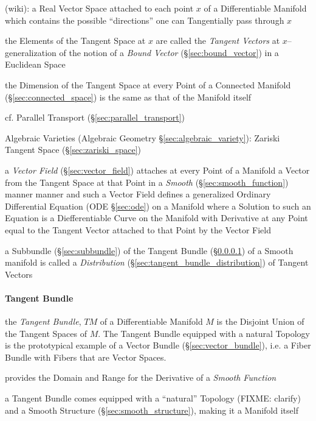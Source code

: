 (wiki): a Real Vector Space attached to each point $x$ of a Differentiable
Manifold which contains the possible ``directions'' one can Tangentially pass
through $x$

the Elements of the Tangent Space at $x$ are called the \emph{Tangent Vectors}
at $x$-- generalization of the notion of a \emph{Bound Vector}
(\S\ref{sec:bound_vector}) in a Euclidean Space

the Dimension of the Tangent Space at every Point of a Connected Manifold
(\S\ref{sec:connected_space}) is the same as that of the Manifold itself

\fist cf. Parallel Transport (\S\ref{sec:parallel_transport})

\fist Algebraic Varieties (Algebraic Geometry \S\ref{sec:algebraic_variety}):
Zariski Tangent Space (\S\ref{sec:zariski_space})

a \emph{Vector Field} (\S\ref{sec:vector_field}) attaches at every Point of a
Manifold a Vector from the Tangent Space at that Point in a \emph{Smooth}
(\S\ref{sec:smooth_function}) manner manner and such a Vector Field defines a
generalized Ordinary Differential Equation (ODE \S\ref{sec:ode}) on a Manifold
where a Solution to such an Equation is a Diefferentiable Curve on the Manifold
with Derivative at any Point equal to the Tangent Vector attached to that Point
by the Vector Field

a Subbundle (\S\ref{sec:subbundle}) of the Tangent Bundle
(\S\ref{sec:tangent_bundle}) of a Smooth manifold is called a
\emph{Distribution} (\S\ref{sec:tangent_bundle_distribution}) of Tangent
Vectors



\paragraph{Tangent Bundle}\label{sec:tangent_bundle}\hfill

the \emph{Tangent Bundle}, $T M$ of a Differentiable Manifold $M$ is the
Disjoint Union of the Tangent Spaces of $M$. The Tangent Bundle equipped with a
natural Topology is the prototypical example of a Vector Bundle
(\S\ref{sec:vector_bundle}), i.e. a Fiber Bundle with Fibers that are Vector
Spaces.

provides the Domain and Range for the Derivative of a \emph{Smooth Function}

a Tangent Bundle comes equipped with a ``natural'' Topology (FIXME: clarify)
and a Smooth Structure (\S\ref{sec:smooth_structure}), making it a Manifold
itself

